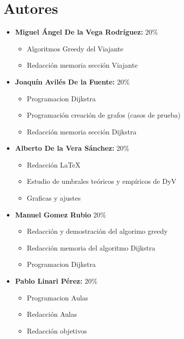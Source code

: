 \documentclass[11pt,openany]{book}
\begin{document}
\tableofcontents %
\newpage %


\chapter{Autores}
\begin{itemize}
      \item \textbf{Miguel Ángel De la Vega Rodríguez:} 20\%
            \begin{itemize}
                  \item Algoritmos Greedy del Viajante
                  \item Redacción memoria sección Viajante
            \end{itemize}
      \item \textbf{Joaquín Avilés De la Fuente:} 20\%
            \begin{itemize}
                  \item Programacion Dijkstra
                  \item Programación creación de grafos (casos de prueba)
                  \item Redacción memoria sección Dijkstra
            \end{itemize}
      \item \textbf{Alberto De la Vera Sánchez: } 20\%
            \begin{itemize}
                  \item Redacción \LaTeX
                  \item Estudio de umbrales teóricos y empíricos de DyV
                  \item Graficas y ajustes
            \end{itemize}
      \item \textbf{Manuel Gomez Rubio} 20\%
            \begin{itemize}
                  \item Redacción y demostración del algorimo greedy
                  \item Redacción memoria del algoritmo Dijkstra
                  \item Programacion Dijkstra
            \end{itemize}
      \item \textbf{Pablo Linari Pérez:} 20\%
            \begin{itemize}
                  \item Programacion Aulas
                  \item Redacción Aulas
                  \item Redacción objetivos
            \end{itemize}
\end{itemize}
\end{document}
